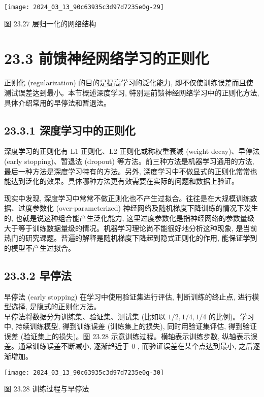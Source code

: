 \documentclass[10pt]{article}
\begin{document}
\begin{CJK*}{UTF8}{bsmi}
\begin{center}
\texttt{[image: 2024\_03\_13\_90c63935c3d97d7235e0g-29]}
\end{center}

图 23.27 层归一化的网络结构

\section*{23.3 前馈神经网络学习的正则化}
正则化 (regularization) 的目的是提高学习的泛化能力, 即不仅使训练误差而且使测试误差达到最小。本节概述深度学习, 特别是前馈神经网络学习中的正则化方法, 具体介绍常用的早停法和暂退法。

\subsection*{23.3.1 深度学习中的正则化}
深度学习的正则化有 L1 正则化、L2 正则化或称权重衰减 (weight decay)、早停法 (early stopping)、暂退法 (dropout) 等方法。前三种方法是机器学习通用的方法, 最后一种方法是深度学习特有的方法。另外, 深度学习中不做显式的正则化常常也能达到泛化的效果。具体哪种方法更有效需要在实际的问题和数据上验证。

现实中发现, 深度学习中常常不做正则化也不产生过拟合。往往是在大规模训练数据、过度参数化 (over-parameterized) 神经网络及随机梯度下降训练的情况下发生的, 也就是说这种组合能产生泛化能力, 这里过度参数化是指神经网络的参数量级大于等于训练数据量级的情况。机器学习理论尚不能很好地分析这种现象, 是当前热门的研究课题。普遍的解释是随机梯度下降起到隐式正则化的作用, 能保证学到的模型不产生过拟合。

\subsection*{23.3.2 早停法}
早停法 (early stopping) 在学习中使用验证集进行评估, 判断训练的终止点, 进行模型选择, 是隐式的正则化方法。\\
早停法将数据分为训练集、验证集、测试集 (比如以 $1 / 2,1 / 4,1 / 4$ 的比例)。学习中, 持续训练模型, 得到训练误差 (训练集上的损失), 同时用验证集评估, 得到验证误差 (验证集上的损失)。图 23.28 示意训练过程。横轴表示训练步数, 纵轴表示误差。通常训练误差不断减小, 逐渐趋近于 0 , 而验证误差在某个点达到最小, 之后逐渐增加。

\begin{center}
\texttt{[image: 2024\_03\_13\_90c63935c3d97d7235e0g-30]}
\end{center}

图 23.28 训练过程与早停法


\end{CJK*}
\end{document}
